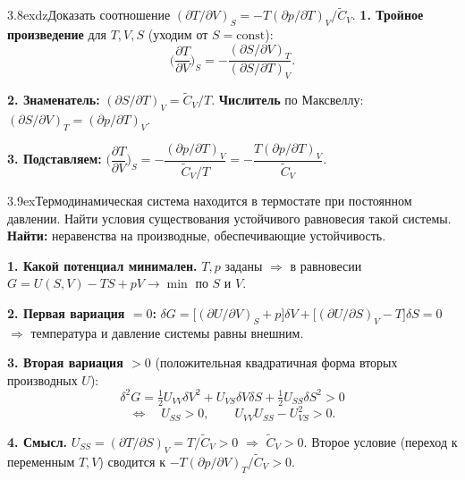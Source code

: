 \begin{problem}{3.8}{exdz}{Доказать соотношение $(\partial T/\partial V)_S=-T(\partial p/\partial T)_V/\widetilde C_V$.}
\textbf{1. Тройное произведение} для $T,V,S$ (уходим от $S=\mathrm{const}$):
\[\Big(\frac{\partial T}{\partial V}\Big)_S=-\frac{(\partial S/\partial V)_T}{(\partial S/\partial T)_V}.\]

\textbf{2. Знаменатель:} $(\partial S/\partial T)_V=\widetilde C_V/T$.
\textbf{Числитель} по Максвеллу: $(\partial S/\partial V)_T=(\partial p/\partial T)_V$.

\textbf{3. Подставляем:} $\Big(\dfrac{\partial T}{\partial V}\Big)_S=-\dfrac{(\partial p/\partial T)_V}{\widetilde C_V/T}=-\dfrac{T(\partial p/\partial T)_V}{\widetilde C_V}$.
\end{problem}

\begin{problem}{3.9}{ex}{Термодинамическая система находится в термостате при постоянном давлении. Найти условия существования устойчивого
равновесия такой системы.}
\textbf{Найти:} неравенства на производные, обеспечивающие устойчивость.

\textbf{1. Какой потенциал минимален.} $T,p$ заданы $\Rightarrow$ в равновесии $G=U(S,V)-TS+pV\to\min$ по $S$ и $V$.

\textbf{2. Первая вариация $=0$:}
$\delta G=\big[(\partial U/\partial V)_S+p\big]\delta V+\big[(\partial U/\partial S)_V-T\big]\delta S=0$
$\Rightarrow$ температура и давление системы равны внешним.

\textbf{3. Вторая вариация $>0$} (положительная квадратичная форма вторых производных $U$):
\[\delta^2G=\tfrac12U_{VV}\delta V^2+U_{VS}\delta V\delta S+\tfrac12U_{SS}\delta S^2>0\]
\[\iff\quad U_{SS}>0,\qquad U_{VV}U_{SS}-U_{VS}^2>0.\]

\textbf{4. Смысл.} $U_{SS}=(\partial T/\partial S)_V=T/\widetilde C_V>0$ $\Rightarrow$ $\widetilde C_V>0$.
Второе условие (переход к переменным $T,V$) сводится к $-T(\partial p/\partial V)_T/\widetilde C_V>0$.
\end{problem}

